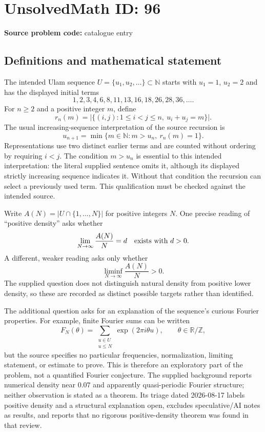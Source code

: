 \documentclass[11pt]{article}
\newcommand{\N}{\mathbb{N}}
\newcommand{\Z}{\mathbb{Z}}
\newcommand{\R}{\mathbb{R}}
\begin{document}
\section*{UnsolvedMath ID: 96}
\textbf{Source problem code:} catalogue entry
\subsection{Definitions and mathematical statement}
The intended Ulam sequence $U=\{u_1,u_2,\ldots\}\subset\N$ starts with $u_1=1$, $u_2=2$ and has the displayed initial terms
\[
1,2,3,4,6,8,11,13,16,18,26,28,36,\ldots.
\]
For $n\geq2$ and a positive integer $m$, define
\[
r_n(m)=\bigl|\{(i,j):1\leq i<j\leq n,\ u_i+u_j=m\}\bigr|.
\]
The usual increasing-sequence interpretation of the source recursion is
\[
u_{n+1}=\min\{m\in\N:m>u_n,\ r_n(m)=1\}.
\]
Representations use two distinct earlier terms and are counted without ordering by requiring $i<j$. The condition $m>u_n$ is essential to this intended interpretation: the literal supplied sentence omits it, although its displayed strictly increasing sequence indicates it. Without that condition the recursion can select a previously used term. This qualification must be checked against the intended source.

Write $A(N)=|U\cap\{1,\ldots,N\}|$ for positive integers $N$. One precise reading of ``positive density'' asks whether
\[
\lim_{N\to\infty}\frac{A(N)}{N}=d\quad\hbox{exists with }d>0.
\]
A different, weaker reading asks only whether
\[
\liminf_{N\to\infty}\frac{A(N)}{N}>0.
\]
The supplied question does not distinguish natural density from positive lower density, so these are recorded as distinct possible targets rather than identified.

The additional question asks for an explanation of the sequence's curious Fourier properties. For example, finite Fourier sums can be written
\[
F_N(\theta)=\sum_{\substack{u\in U\\u\leq N}}\exp(2\pi i\theta u),\qquad \theta\in\R/\Z,
\]
but the source specifies no particular frequencies, normalization, limiting statement, or estimate to prove. This is therefore an exploratory part of the problem, not a quantified Fourier conjecture. The supplied background reports numerical density near $0.07$ and apparently quasi-periodic Fourier structure; neither observation is stated as a theorem. Its triage dated 2026-08-17 labels positive density and a structural explanation open, excludes speculative/AI notes as results, and reports that no rigorous positive-density theorem was found in that review.
\end{document}
